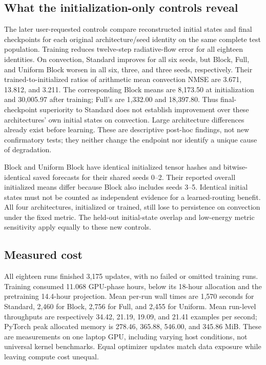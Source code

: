 \subsection{What the initialization-only controls reveal}
The later user-requested controls compare reconstructed initial states and final checkpoints for each original architecture/seed identity on the same complete test population. Training reduces twelve-step radiative-flow error for all eighteen identities. On convection, Standard improves for all six seeds, but Block, Full, and Uniform Block worsen in all six, three, and three seeds, respectively. Their trained-to-initialized ratios of arithmetic mean convection NMSE are 3.671, 13.812, and 3.211. The corresponding Block means are 8,173.50 at initialization and 30,005.97 after training; Full's are 1,332.00 and 18,397.80. Thus final-checkpoint superiority to Standard does not establish improvement over these architectures' own initial states on convection. Large architecture differences already exist before learning. These are descriptive post-hoc findings, not new confirmatory tests; they neither change the endpoint nor identify a unique cause of degradation\cite{studycode}.

Block and Uniform Block have identical initialized tensor hashes and bitwise-identical saved forecasts for their shared seeds 0--2. Their reported overall initialized means differ because Block also includes seeds 3--5. Identical initial states must not be counted as independent evidence for a learned-routing benefit. All four architectures, initialized or trained, still lose to persistence on convection under the fixed metric. The held-out initial-state overlap and low-energy metric sensitivity apply equally to these new controls.

\subsection{Measured cost}
All eighteen runs finished 3,175 updates, with no failed or omitted training runs. Training consumed 11.068 GPU-phase hours, below its 18-hour allocation and the pretraining 14.4-hour projection. Mean per-run wall times are 1,570 seconds for Standard, 2,460 for Block, 2,756 for Full, and 2,455 for Uniform. Mean run-level throughputs are respectively 34.42, 21.19, 19.09, and 21.41 examples per second; PyTorch peak allocated memory is 278.46, 365.88, 546.00, and 345.86 MiB. These are measurements on one laptop GPU, including varying host conditions, not universal kernel benchmarks. Equal optimizer updates match data exposure while leaving compute cost unequal.

